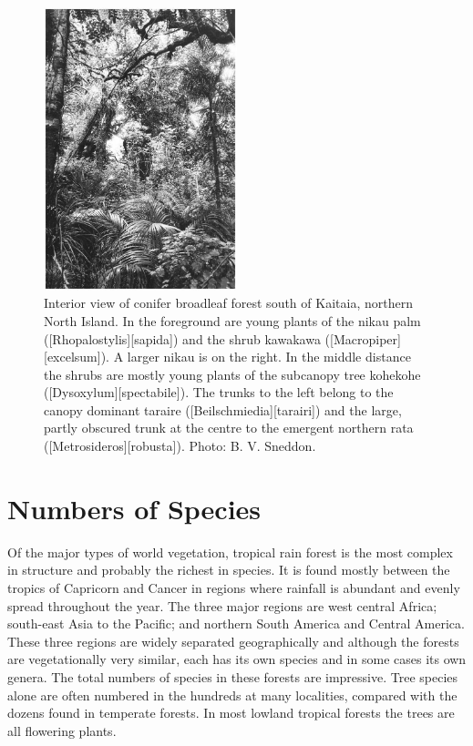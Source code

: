 \begin{figure}
	\includegraphics[width=0.5\textwidth]{graphics/figure8conifer.jpg}
	\centering
	\caption[Interior view of conifer broadleaf forest south of Kaitaia]{Interior view of conifer broadleaf forest south of Kaitaia, northern North Island.
	In the foreground are young plants of the nikau palm ([Rhopalostylis][sapida]) and the shrub kawakawa ([Macropiper][excelsum]).
	A larger nikau is on the right.
	In the middle distance the shrubs are mostly young plants of the subcanopy tree kohekohe ([Dysoxylum][spectabile]).
	The trunks to the left belong to the canopy dominant taraire ([Beilschmiedia][tarairi]) and the large, partly obscured trunk at the centre to the emergent northern rata ([Metrosideros][robusta]).
	Photo: B. V. Sneddon.}%
	\label{fig:8conifer}
\end{figure}

\section{Numbers of Species}

Of the major types of world vegetation, tropical rain forest is the most complex in structure and probably the richest in species.
It is found mostly between the tropics of Capricorn and Cancer in regions where rainfall is abundant and evenly spread throughout the year.
The three major regions are west central Africa; south-east Asia to the Pacific; and northern South America and Central America.
These three regions are widely separated geographically and although the forests are vegetationally very similar, each has its own species and in some cases its own genera.
The total numbers of species in these forests are impressive.
Tree species alone are often numbered in the hundreds at many localities, compared with the dozens found in temperate forests.
In most lowland tropical forests the trees are all flowering plants.

